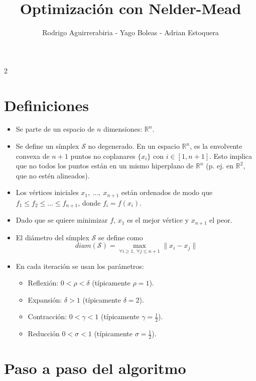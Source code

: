 \documentclass[a4paper, 9pt]{article}
\title{Optimización con Nelder-Mead}
\author{Rodrigo Aguirrerabiria - Yago Boleas - Adrian Estoquera}
\begin{document}
    \maketitle \thispagestyle{empty}
    
    \begin{multicols}{2}
    
        \section{Definiciones}
        
        \begin{itemize}
            \item Se parte de un espacio de $n$ dimensiones: \(\mathbb{R}^n\).
            \item Se define un símplex $\mathcal{S}$ no degenerado. En un espacio $\mathbb{R}^n$, es la envolvente convexa de $n+1$ puntos no coplanares $\{x_i\}$ con $i \in [1, n+1]$. Esto implica que no todos los puntos están en un mismo hiperplano de $\mathbb{R}^n$ (p. ej. en \(\mathbb{R}^2\), que no estén alineados).
            \item Los vértices iniciales $x_1,~...,~x_{n+1}$ están ordenados de modo que $f_1 \leq f_2 \leq ... \leq f_{n+1}$, donde $f_i = f(x_i)$.
            \item Dado que se quiere minimizar $f$, $x_1$ es el mejor vértice y $x_{n+1}$ el peor.
            \item El diámetro del símplex $\mathcal{S}$ se define como \[diam(\mathcal{S}) = \max_{\forall i \geq 1,~ \forall j \leq n+1} \lVert x_i - x_j\rVert\]
            \item En cada iteración se usan los parámetros:
            \begin{itemize}
                \item Reflexión: $0 < \rho < \delta$ (típicamente $\rho=1$).
                \item Expansión: $\delta > 1$ (típicamente $\delta=2$).
                \item Contracción: $0 < \gamma < 1$ (típicamente $\gamma=\tfrac{1}{2} $).
                \item Reducción $0 < \sigma < 1$ (típicamente $\sigma=\tfrac{1}{2}$).
            \end{itemize}  
        \end{itemize}
        
        
        \section{Paso a paso del algoritmo}
        

\end{multicols}
\end{document}
